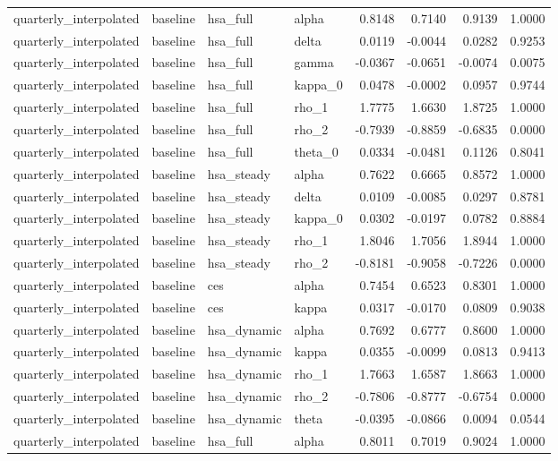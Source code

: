 \begin{tabular}{llllrrrr}
quarterly\_interpolated & baseline & hsa\_full & alpha & 0.8148 & 0.7140 & 0.9139 & 1.0000 \\
quarterly\_interpolated & baseline & hsa\_full & delta & 0.0119 & -0.0044 & 0.0282 & 0.9253 \\
quarterly\_interpolated & baseline & hsa\_full & gamma & -0.0367 & -0.0651 & -0.0074 & 0.0075 \\
quarterly\_interpolated & baseline & hsa\_full & kappa\_0 & 0.0478 & -0.0002 & 0.0957 & 0.9744 \\
quarterly\_interpolated & baseline & hsa\_full & rho\_1 & 1.7775 & 1.6630 & 1.8725 & 1.0000 \\
quarterly\_interpolated & baseline & hsa\_full & rho\_2 & -0.7939 & -0.8859 & -0.6835 & 0.0000 \\
quarterly\_interpolated & baseline & hsa\_full & theta\_0 & 0.0334 & -0.0481 & 0.1126 & 0.8041 \\
quarterly\_interpolated & baseline & hsa\_steady & alpha & 0.7622 & 0.6665 & 0.8572 & 1.0000 \\
quarterly\_interpolated & baseline & hsa\_steady & delta & 0.0109 & -0.0085 & 0.0297 & 0.8781 \\
quarterly\_interpolated & baseline & hsa\_steady & kappa\_0 & 0.0302 & -0.0197 & 0.0782 & 0.8884 \\
quarterly\_interpolated & baseline & hsa\_steady & rho\_1 & 1.8046 & 1.7056 & 1.8944 & 1.0000 \\
quarterly\_interpolated & baseline & hsa\_steady & rho\_2 & -0.8181 & -0.9058 & -0.7226 & 0.0000 \\
quarterly\_interpolated & baseline & ces & alpha & 0.7454 & 0.6523 & 0.8301 & 1.0000 \\
quarterly\_interpolated & baseline & ces & kappa & 0.0317 & -0.0170 & 0.0809 & 0.9038 \\
quarterly\_interpolated & baseline & hsa\_dynamic & alpha & 0.7692 & 0.6777 & 0.8600 & 1.0000 \\
quarterly\_interpolated & baseline & hsa\_dynamic & kappa & 0.0355 & -0.0099 & 0.0813 & 0.9413 \\
quarterly\_interpolated & baseline & hsa\_dynamic & rho\_1 & 1.7663 & 1.6587 & 1.8663 & 1.0000 \\
quarterly\_interpolated & baseline & hsa\_dynamic & rho\_2 & -0.7806 & -0.8777 & -0.6754 & 0.0000 \\
quarterly\_interpolated & baseline & hsa\_dynamic & theta & -0.0395 & -0.0866 & 0.0094 & 0.0544 \\
quarterly\_interpolated & baseline & hsa\_full & alpha & 0.8011 & 0.7019 & 0.9024 & 1.0000 \\

\end{tabular}

